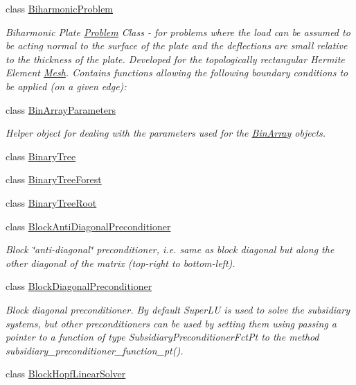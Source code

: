 \begin{DoxyCompactItemize}
class \hyperlink{classoomph_1_1BiharmonicProblem}{Biharmonic\+Problem}
\begin{DoxyCompactList}\small\item\em Biharmonic Plate \hyperlink{classoomph_1_1Problem}{Problem} Class -\/ for problems where the load can be assumed to be acting normal to the surface of the plate and the deflections are small relative to the thickness of the plate. Developed for the topologically rectangular Hermite Element \hyperlink{classoomph_1_1Mesh}{Mesh}. Contains functions allowing the following boundary conditions to be applied (on a given edge)\+: \end{DoxyCompactList}\item 
class \hyperlink{classoomph_1_1BinArrayParameters}{Bin\+Array\+Parameters}
\begin{DoxyCompactList}\small\item\em Helper object for dealing with the parameters used for the \hyperlink{classBinArray}{Bin\+Array} objects. \end{DoxyCompactList}\item 
class \hyperlink{classoomph_1_1BinaryTree}{Binary\+Tree}
\item 
class \hyperlink{classoomph_1_1BinaryTreeForest}{Binary\+Tree\+Forest}
\item 
class \hyperlink{classoomph_1_1BinaryTreeRoot}{Binary\+Tree\+Root}
\item 
class \hyperlink{classoomph_1_1BlockAntiDiagonalPreconditioner}{Block\+Anti\+Diagonal\+Preconditioner}
\begin{DoxyCompactList}\small\item\em Block \char`\"{}anti-\/diagonal\char`\"{} preconditioner, i.\+e. same as block diagonal but along the other diagonal of the matrix (top-\/right to bottom-\/left). \end{DoxyCompactList}\item 
class \hyperlink{classoomph_1_1BlockDiagonalPreconditioner}{Block\+Diagonal\+Preconditioner}
\begin{DoxyCompactList}\small\item\em Block diagonal preconditioner. By default Super\+LU is used to solve the subsidiary systems, but other preconditioners can be used by setting them using passing a pointer to a function of type Subsidiary\+Preconditioner\+Fct\+Pt to the method subsidiary\+\_\+preconditioner\+\_\+function\+\_\+pt(). \end{DoxyCompactList}\item 
class \hyperlink{classoomph_1_1BlockHopfLinearSolver}{Block\+Hopf\+Linear\+Solver}

\end{DoxyCompactItemize}
